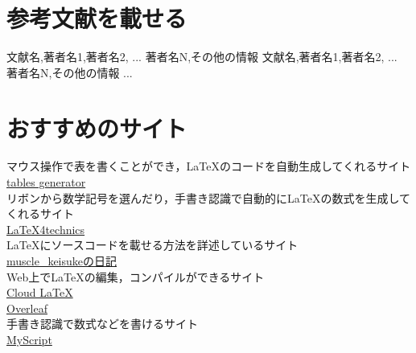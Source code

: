 \documentclass[a4j,titlepage,dvipdfmx,uplatex]{jsarticle}   %
\begin{document}
\resizebox{\columnwidth}{!}{\centering}

\section{参考文献を載せる}
\begin{thebibliography}{99}
  \bibitem[hoge] 文献名,著者名1,著者名2, ... 著者名N,その他の情報
  \bibitem[fuga] 文献名,著者名1,著者名2, ... 著者名N,その他の情報
  ...
\end{thebibliography}
\appendix
\section{おすすめのサイト}\noindent
マウス操作で表を書くことができ，\LaTeX のコードを自動生成してくれるサイト \\
\href{http://www.tablesgenerator.com/latex_tables}{tables generator} \\
リボンから数学記号を選んだり，手書き認識で自動的に\LaTeX の数式を生成してくれるサイト \\
\href{https://www.latex4technics.com/}{LaTeX4technics} \\
\LaTeX にソースコードを載せる方法を詳述しているサイト \\
\href{http://muscle-keisuke.hatenablog.com/}{muscle\_keisukeの日記} \\
Web上で\LaTeX の編集，コンパイルができるサイト \\
\href{https://cloudlatex.io/}{Cloud LaTeX} \\
\href{https://www.overleaf.com/}{Overleaf} \\
手書き認識で数式などを書けるサイト \\
\href{https://webdemo.myscript.com/index.html}{MyScript}
\end{document}
